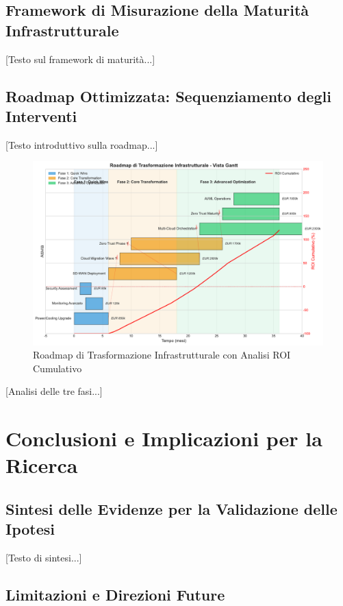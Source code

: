 \subsection{Framework di Misurazione della Maturità Infrastrutturale}

[Testo sul framework di maturità...]

\subsection{Roadmap Ottimizzata: Sequenziamento degli Interventi}

[Testo introduttivo sulla roadmap...]

\begin{figure}[htbp]
\centering
\includegraphics[width=\textwidth]{figura_3_4_roadmap.pdf}
\caption{Roadmap di Trasformazione Infrastrutturale con Analisi ROI Cumulativo}
\label{fig:transformation_roadmap}
\end{figure}

[Analisi delle tre fasi...]

\section{Conclusioni e Implicazioni per la Ricerca}

\subsection{Sintesi delle Evidenze per la Validazione delle Ipotesi}

[Testo di sintesi...]

\subsection{Limitazioni e Direzioni Future}

